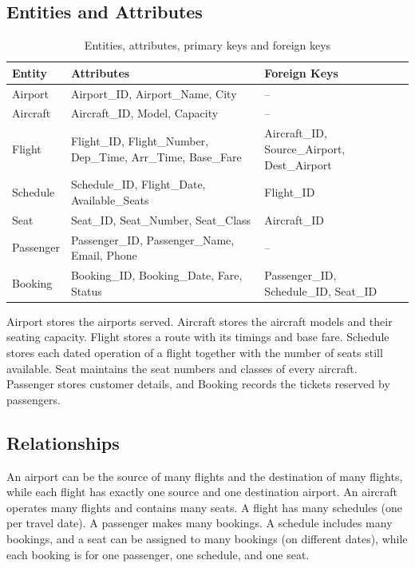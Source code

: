 \documentclass[12pt,a4paper]{article}
\renewcommand{\arraystretch}{1.15}
\begin{document}
\subsection{Entities and Attributes}
\begin{table}[H]
\centering
\small
\renewcommand{\arraystretch}{1.3}

\begin{tabularx}{\textwidth}{
    @{}
    >{\raggedright\arraybackslash}p{}
    >{\raggedright\arraybackslash}X
    >{\raggedright\arraybackslash}p{}
    @{}
}
\toprule
\textbf{Entity} & \textbf{Attributes} & \textbf{Foreign Keys} \\
\midrule

Airport &
Airport\_ID, Airport\_Name, City &
-- \\

Aircraft &
Aircraft\_ID, Model, Capacity &
-- \\

Flight &
Flight\_ID, Flight\_Number, Dep\_Time, Arr\_Time, Base\_Fare &
Aircraft\_ID, Source\_Airport, Dest\_Airport \\

Schedule &
Schedule\_ID, Flight\_Date, Available\_Seats &
Flight\_ID \\

Seat &
Seat\_ID, Seat\_Number, Seat\_Class &
Aircraft\_ID \\

Passenger &
Passenger\_ID, Passenger\_Name, Email, Phone &
-- \\

Booking &
Booking\_ID, Booking\_Date, Fare, Status &
Passenger\_ID, Schedule\_ID, Seat\_ID \\

\bottomrule
\end{tabularx}

\caption{Entities, attributes, primary keys and foreign keys}
\label{tab:entities}
\end{table}
Airport stores the airports served. Aircraft stores the aircraft models and their seating capacity.
Flight stores a route with its timings and base fare. Schedule stores each dated operation of a flight
together with the number of seats still available. Seat maintains the seat numbers and classes of every
aircraft. Passenger stores customer details, and Booking records the tickets reserved by passengers.

\subsection{Relationships}
An airport can be the source of many flights and the destination of many flights, while each flight has
exactly one source and one destination airport. An aircraft operates many flights and contains many seats.
A flight has many schedules (one per travel date). A passenger makes many bookings. A schedule includes
many bookings, and a seat can be assigned to many bookings (on different dates), while each booking is for
one passenger, one schedule, and one seat.
\end{document}
